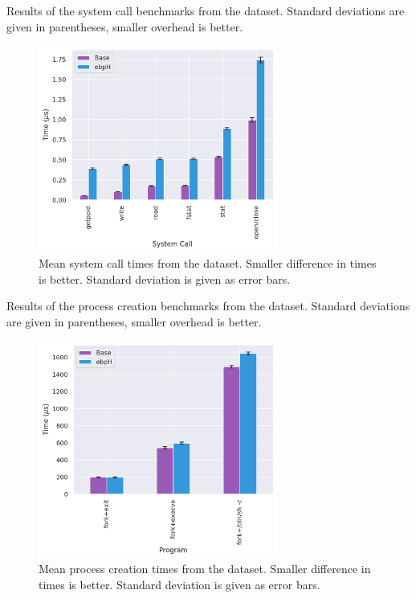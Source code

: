 \documentclass[
  12pt]{findlay}
\begin{document}
\begin{table}
    \caption{Results of the system call benchmarks from the  dataset.
    Standard deviations are given in parentheses, smaller overhead is better.}
    \label{bronte_lmbench_syscall}
    
\end{table}

\begin{figure}
\centering
\includegraphics[width=0.7\textwidth,height=\textheight]{../data/bench/bronte-lmbench/syscall_times.png}
\caption{\label{bronte_lmbench_syscall_graph}Mean system call times from
the  dataset. Smaller difference in times is
better. Standard deviation is given as error bars.}
\end{figure}

\begin{table}
    \caption{Results of the process creation benchmarks from the  dataset.
    Standard deviations are given in parentheses, smaller overhead is better.}
    \label{bronte_lmbench_process}
    
\end{table}

\begin{figure}
\centering
\includegraphics[width=0.7\textwidth,height=\textheight]{../data/bench/bronte-lmbench/process_times.png}
\caption{\label{bronte_lmbench_process_graph}Mean process creation times
from the  dataset. Smaller difference in times is
better. Standard deviation is given as error bars.}
\end{figure}
\end{document}
